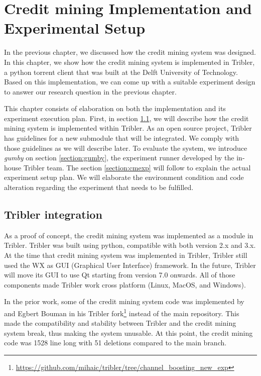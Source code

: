 \chapter{Credit mining Implementation and Experimental Setup}
\label{chp:implexperiment}
In the previous chapter, we discussed how the credit mining system was designed. In this chapter, we show how the credit mining system is implemented in Tribler, a python torrent client that was built at the Delft University of Technology. Based on this implementation, we can come up with a suitable experiment design to answer our research question in the previous chapter. 

This chapter consists of elaboration on both the implementation and its experiment execution plan. First, in section \ref{section:triblerintregration}, we will describe how the credit mining system is implemented within Tribler. As an open source project, Tribler has guidelines for a new submodule that will be integrated. We comply with those guidelines as we will describe later. To evaluate the system, we introduce \textit{gumby} on section \ref{section:gumby}, the experiment runner developed by the in-house Tribler team. The section \ref{section:cmexp} will follow to explain the actual experiment setup plan. We will elaborate the environment condition and code alteration regarding the experiment that needs to be fulfilled.

\section{Tribler integration}
\label{section:triblerintregration}
As a proof of concept, the credit mining system was implemented as a module in Tribler. Tribler was built using python, compatible with both version 2.x and 3.x. At the time that credit mining system was implemented in Tribler, Tribler still used the WX as GUI (Graphical User Interface) framework. In the future, Tribler will move its GUI to use Qt starting from version 7.0 onwards. All of those components made Tribler work cross platform (Linux, MacOS, and Windows).

In the prior work, some of the credit mining system code was implemented by \citeauthor{2015:creditmining:capota} and Egbert Bouman in his Tribler fork\footnote{\url{https://github.com/mihaic/tribler/tree/channel_boosting_new_exp}} instead of the main repository. This made the compatibility and stability between Tribler and the credit mining system break, thus making the system unusable. At this point, the credit mining code was 1528 line long with 51 deletions compared to the main branch.

